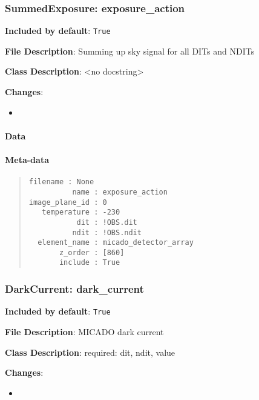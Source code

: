 \subsubsection{SummedExposure: \textquotedbl{}exposure\_action\textquotedbl{}%
  \label{summedexposure-exposure-action}%
}

\textbf{Included by default}: \texttt{True}

\textbf{File Description}: Summing up sky signal for all DITs and NDITs

\textbf{Class Description}: <no docstring>

\textbf{Changes}:

\begin{itemize}
\item \end{itemize}


\paragraph{Data%
  \label{id5}%
}


\paragraph{Meta-data%
  \label{id6}%
}

\begin{quote}
\begin{alltt}
\begin{lstlisting}[frame=single]
      filename : None
          name : exposure_action
image_plane_id : 0
   temperature : -230
           dit : !OBS.dit
          ndit : !OBS.ndit
  element_name : micado_detector_array
       z_order : [860]
       include : True
\end{lstlisting}
\end{alltt}
\end{quote}


\subsubsection{DarkCurrent: \textquotedbl{}dark\_current\textquotedbl{}%
  \label{darkcurrent-dark-current}%
}

\textbf{Included by default}: \texttt{True}

\textbf{File Description}: MICADO dark current

\textbf{Class Description}: required: dit, ndit, value

\textbf{Changes}:

\begin{itemize}
\item \end{itemize}


